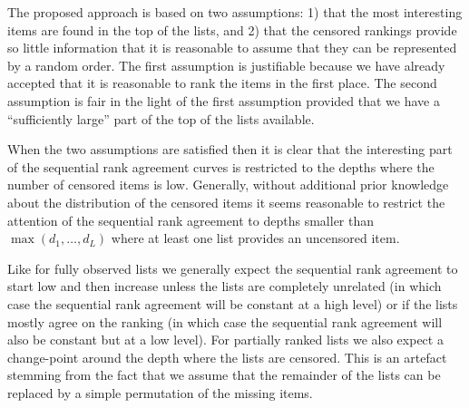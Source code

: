 \documentclass[12pt,a4paper]{article}
\theoremstyle{plain}
\begin{document}
The proposed approach is based on two assumptions: 1) that the most
interesting items are found in the top of the lists, and 2) that the
censored rankings provide so little information that it is reasonable
to assume that they can be represented by a random order. The first
assumption is justifiable because we have already accepted that it is
reasonable to rank the items in the first place. The second assumption
is fair in the light of the first assumption provided that we have a
``sufficiently large'' part of the top of the lists available.

When the two assumptions are satisfied then it is clear that the
interesting part of the sequential rank agreement curves is restricted
to the depths where the number of censored items is
low. Generally, without additional prior knowledge about the
distribution of the censored items it seems reasonable to restrict the
attention of the sequential rank agreement to depths smaller than
$\max(d_1, \ldots, d_L)$ where at least one list provides an
uncensored item.

Like for fully observed lists we generally expect the sequential rank
agreement to start low and then increase unless the lists are
completely unrelated (in which case the sequential rank agreement will
be constant at a high level) or if the lists mostly agree on the
ranking (in which case the sequential rank agreement will also be
constant but at a low level). For partially ranked lists we also
expect a change-point around the depth where the lists are
censored. This is an artefact stemming from the fact that we assume
that the remainder of the lists can be replaced by a simple
permutation of the missing items.




\end{document}
